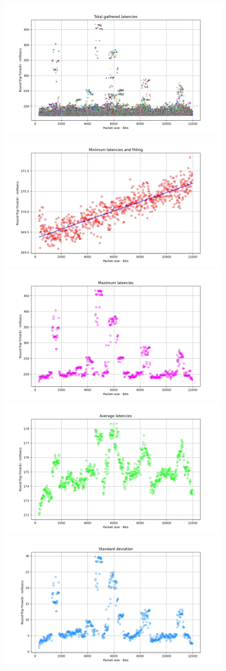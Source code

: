 \begin{figure}
    \centering
    \includegraphics[width = .9\textwidth]{hw-2/report/imgs/100-instances/la-total-latencies.png}
    \includegraphics[width = .49\textwidth]{hw-2/report/imgs/100-instances/la-min-latencies.png}
    \includegraphics[width = .49\textwidth]{hw-2/report/imgs/100-instances/la-max-latencies.png}
    \includegraphics[width = .49\textwidth]{hw-2/report/imgs/100-instances/la-avg-latencies.png}
    \includegraphics[width = .49\textwidth]{hw-2/report/imgs/100-instances/la-standard-deviation.png}
\end{figure}


